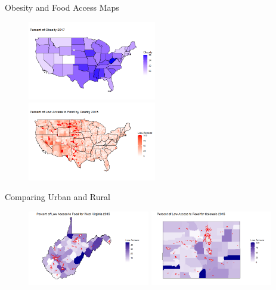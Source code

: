 \documentclass{beamer} %
\begin{document}

\begin{frame}{Obesity and Food Access Maps}
\begin{figure}
   \includegraphics[width=0.5\textwidth]{Obesity_Map.jpg}
   \hfill
   \includegraphics[width=0.5\textwidth]{Food_Access.jpg}
\end{figure}
\end{frame}


 
\begin{frame}{Comparing Urban and Rural}
\begin{figure}
   \includegraphics[width=0.475\textwidth]{WV_Map.jpg}
   \hfill
   \includegraphics[width=0.475\textwidth]{CO_Map.jpg}
\end{figure}
\end{frame}
\end{document}
